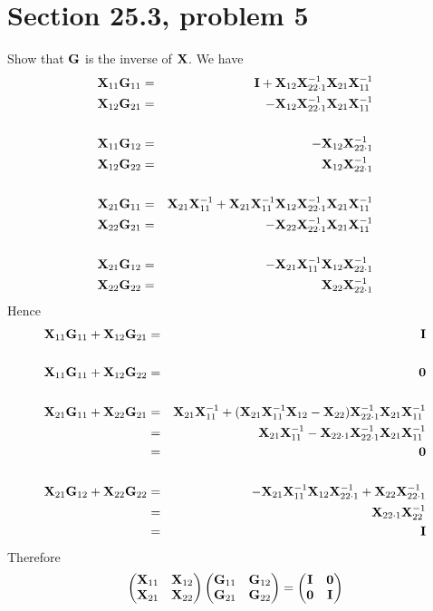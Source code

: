 \section{Section 25.3, problem 5}
Show that $\bf G$ is the inverse of $\bf X$.
We have
\begin{eqnarray*}
{\bf X}_{11}{\bf G}_{11}&=&{\bf I}+{\bf X}_{12}{\bf X}_{22\cdot1}^{-1}{\bf X}_{21}{\bf X}_{11}^{-1}\\
{\bf X}_{12}{\bf G}_{21}&=&-{\bf X}_{12}{\bf X}_{22\cdot1}^{-1}{\bf X}_{21}{\bf X}_{11}^{-1}\\
\\
{\bf X}_{11}{\bf G}_{12}&=&-{\bf X}_{12}{\bf X}_{22\cdot1}^{-1}\\
{\bf X}_{12}{\bf G}_{22}&=&{\bf X}_{12}{\bf X}_{22\cdot1}^{-1}\\
\\
{\bf X}_{21}{\bf G}_{11}&=&{\bf X}_{21}{\bf X}_{11}^{-1}+
{\bf X}_{21}{\bf X}_{11}^{-1}{\bf X}_{12}{\bf X}_{22\cdot1}^{-1}{\bf X}_{21}{\bf X}_{11}^{-1}\\
{\bf X}_{22}{\bf G}_{21}&=&-{\bf X}_{22}{\bf X}_{22\cdot1}^{-1}{\bf X}_{21}{\bf X}_{11}^{-1}\\
\\
{\bf X}_{21}{\bf G}_{12}&=&-{\bf X}_{21}{\bf X}_{11}^{-1}{\bf X}_{12}{\bf X}_{22\cdot1}^{-1}\\
{\bf X}_{22}{\bf G}_{22}&=&{\bf X}_{22}{\bf X}_{22\cdot1}^{-1}
\end{eqnarray*}
Hence
\begin{eqnarray*}
{\bf X}_{11}{\bf G}_{11}+{\bf X}_{12}{\bf G}_{21}&=&{\bf I}\\
\\
{\bf X}_{11}{\bf G}_{11}+{\bf X}_{12}{\bf G}_{22}&=&{\bf 0}\\
\\
{\bf X}_{21}{\bf G}_{11}+{\bf X}_{22}{\bf G}_{21}&=&{\bf X}_{21}{\bf X}_{11}^{-1}+
({\bf X}_{21}{\bf X}_{11}^{-1}{\bf X}_{12}-{\bf X}_{22}){\bf X}_{22\cdot1}^{-1}{\bf X}_{21}{\bf X}_{11}^{-1}\\
&=&{\bf X}_{21}{\bf X}_{11}^{-1}-{\bf X}_{22\cdot1}{\bf X}_{22\cdot1}^{-1}{\bf X}_{21}{\bf X}_{11}^{-1}\\
&=&{\bf 0}\\
\\
{\bf X}_{21}{\bf G}_{12}+{\bf X}_{22}{\bf G}_{22}&=&-{\bf X}_{21}{\bf X}_{11}^{-1}{\bf X}_{12}{\bf X}_{22\cdot1}^{-1}
+{\bf X}_{22}{\bf X}_{22\cdot1}^{-1}\\
&=&{\bf X}_{22\cdot1}{\bf X}_{22}^{-1}\\
&=&{\bf I}
\end{eqnarray*}
Therefore
$$\left(\begin{matrix}
{\bf X}_{11} & {\bf X}_{12}\cr
{\bf X}_{21} & {\bf X}_{22}
\end{matrix}\right)\left(\begin{matrix}
{\bf G}_{11} & {\bf G}_{12}\cr
{\bf G}_{21} & {\bf G}_{22}
\end{matrix}\right)=\left(\begin{matrix}
{\bf I} & {\bf 0}\cr
{\bf 0} & {\bf I}
\end{matrix}\right)
$$

